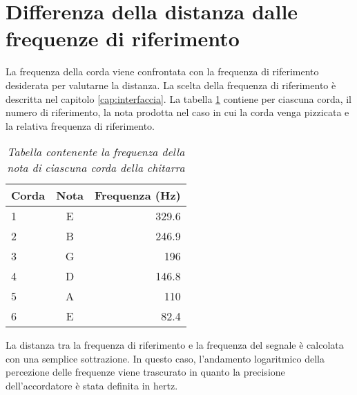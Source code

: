 \section{Differenza della distanza dalle frequenze di riferimento}\label{cap:distanza}

La frequenza della corda viene confrontata con la frequenza di riferimento desiderata per valutarne la distanza.
La scelta della frequenza di riferimento è descritta nel capitolo \ref{cap:interfaccia}.
La tabella \ref{tab:frequenze_riferimento} contiene per ciascuna corda, il numero di riferimento, la nota prodotta nel caso in cui la corda venga pizzicata e la relativa frequenza di riferimento.

	\begin{table}[h]
	\center
	\begin{tabular}{|l|c|r|}
		\hline
		Corda	& 	Nota    & Frequenza (Hz) \\
		\hline
		1	&	E	&	329.6    \\
		2	&	B	&	246.9    \\
		3	&	G	&	196      \\
		4	&	D	&	146.8    \\
		5	&	A	&	110      \\
		6	&	E	&	82.4     \\		
		\hline
	\end{tabular}
	\caption{\textit{Tabella contenente la frequenza della nota di ciascuna corda della chitarra \cite{giordano2009reasoning}}}
	\label{tab:frequenze_riferimento}
	\end{table}

La distanza tra la frequenza di riferimento e la frequenza del segnale è calcolata con una semplice sottrazione.
In questo caso, l'andamento logaritmico della percezione delle frequenze viene trascurato in quanto la precisione dell'accordatore è stata definita in hertz.
